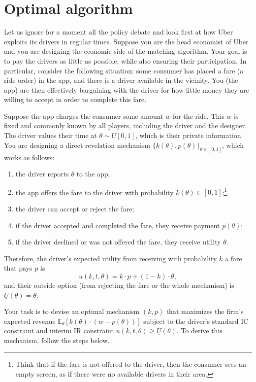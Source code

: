 \documentclass[a4paper]{article}
\begin{document}
	
	
\section{Optimal algorithm}
	
	Let us ignore for a moment all the policy debate and look first at how Uber exploits its drivers in regular times. Suppose you are the head economist of Uber and you are designing the economic side of the matching algorithm. Your goal is to pay the drivers as little as possible, while also ensuring their participation. In particular, consider the following situation: some consumer has placed a fare (a ride order) in the app, and there is a driver available in the vicinity. You (the app) are then effectively bargaining with the driver for how little money they are willing to accept in order to complete this fare.
	
	Suppose the app charges the consumer some amount $w$ for the ride. This $w$ is fixed and commonly known by all players, including the driver and the designer. The driver values their time at $\theta \sim U[0,1]$, which is their private information. You are designing a direct revelation mechanism $\{k(\theta),p(\theta)\}_{\theta\in[0,1]}$, which works as follows:
	\begin{enumerate}[label=(\roman{enumi})]
		\item the driver reports $\theta$ to the app;
		\item the app offers the fare to the driver with probability $k(\theta) \in [0,1]$;\footnote{Think that if the fare is not offered to the driver, then the consumer sees an empty screen, as if there were no available drivers in their area.}
		\item the driver can accept or reject the fare;
		\item if the driver accepted and completed the fare, they receive payment $p(\theta)$;
		\item if the driver declined or was not offered the fare, they receive utility $\theta$.
	\end{enumerate}
	
	Therefore, the driver's expected utility from receiving with probability $k$ a fare that pays $p$ is
	$$u(k,t,\theta) = k \cdot p + (1-k) \cdot \theta,$$
	and their outside option (from rejecting the fare or the whole mechanism) is $\underline{U}(\theta) = \theta$.
	
	Your task is to devise an optimal mechanism $(k,p)$ that maximizes the firm's expected revenue $\mathbb{E}_\theta [k(\theta) \cdot (w-p(\theta))]$ subject to the driver's standard IC constraint and interim IR constraint $u(k,t,\theta) \geq \underline{U}(\theta)$. To derive this mechanism, follow the steps below.
	
\end{document}
